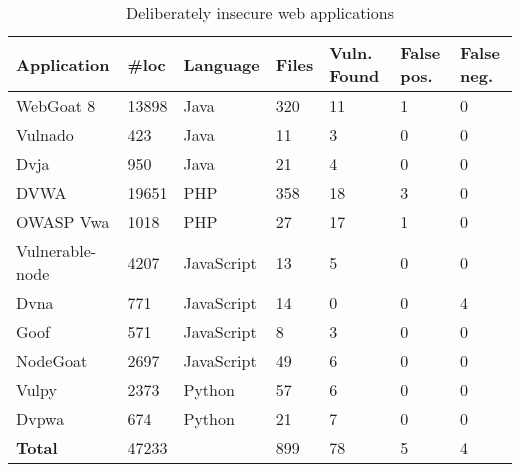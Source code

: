 \begin{table*}[htbp]
    \caption{Deliberately insecure web applications}
    \begin{center}
        \begin{tabular}{|l|| l | l  |l | l | l | l |}
            \hline
            \textbf{Application}  & \textbf{\#loc}      & \textbf{Language}      & \textbf{Files}     & \textbf{Vuln. Found } & \textbf{False pos.} & \textbf{False neg.} \\ [0.5ex] 
            \hline\hline   
            WebGoat 8             & 13898     & Java       & 320        & 11 & 1 & 0\\
            \hline
            Vulnado               & 423       & Java       & 11         & 3 & 0 & 0\\
            \hline
            Dvja                  & 950       & Java       & 21         & 4 & 0 & 0\\
            \hline
             DVWA                 & 19651     & PHP        & 358        & 18 & 3  & 0\\
            \hline
             OWASP Vwa            & 1018      & PHP        & 27         & 17 & 1 & 0\\   
            \hline
             Vulnerable-node      & 4207      & JavaScript & 13         & 5 & 0 & 0\\  
            \hline
             Dvna                 & 771      & JavaScript  & 14         & 0 & 0 & 4\\
            \hline
             Goof                 & 571      & JavaScript  & 8         & 3 & 0 & 0 \\
            \hline  
             NodeGoat                 & 2697      & JavaScript  & 49   & 6 & 0& 0 \\
            \hline  
             Vulpy                 & 2373      & Python    & 57         & 6  & 0& 0\\
            \hline  
             Dvpwa                 & 674      & Python    & 21         & 7  & 0 & 0\\   [0.5ex]  
            \hline\hline   
            \textbf{Total}        & 47233 &              &  899 &  78  & 5 &  4\\
            \hline
        \end{tabular}
    \label{results}
    \end{center}
\end{table*} 


